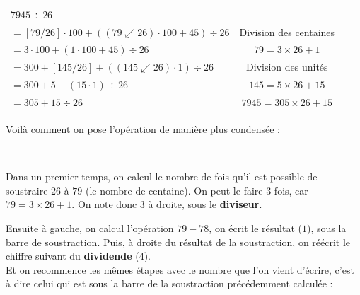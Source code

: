 \documentclass[a4paper, twoside]{article}
\begin{document}
				\begin{tabular}{l|c}

				$ 7945 \div 26$

				\tabularnewline

				$= [79/26] \cdot 100 + ( (79\swarrow26) \cdot 100 + 45 ) \div 26$ & Division des centaines

				\tabularnewline

				$= 3 \cdot 100 + ( 1 \cdot 100 + 45 ) \div 26$ & $79 = 3\times26+1$

				\tabularnewline

				$= 300 + [145/26] + ( (145\swarrow26) \cdot 1 ) \div 26$ & Division des unités

				\tabularnewline

				$= 300 + 5 + ( 15 \cdot 1 ) \div 26$ & $145 = 5\times26+15$

				\tabularnewline

				$= 305 + 15 \div 26 $ & \boldmath $7945 = 305 \times 26 + 15$

				\tabularnewline

				\end{tabular}

			\singlespacing

			Voilà comment on pose l'opération de manière plus condensée : 

				\begin{center}

				 \\

				\end{center}

			Dans un premier temps, on calcul le nombre de fois qu'il est possible 
			de soustraire $26$ à $79$ (le nombre de centaine). 
			On peut le faire $3$ fois, car $79 = 3 \times 26+1$. 
			On note donc $3$ à droite, sous le \textbf{diviseur}. 

			Ensuite à gauche, on calcul l'opération $79-78$, 
			on écrit le résultat ($1$), sous la barre de soustraction.
			Puis, à droite du résultat de la soustraction, 
			on réécrit le chiffre suivant du \textbf{dividende} ($4$).\\

			Et on recommence les mêmes étapes avec le nombre que l'on vient d'écrire, 
			c'est à dire celui qui est sous la barre de la soustraction précédemment calculée : 

			\vspace{2 mm}
\end{document}
